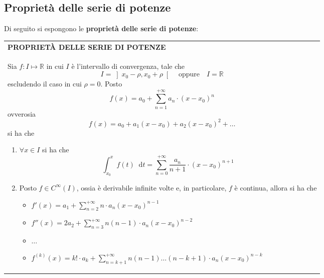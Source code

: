\documentclass[a4paper]{extarticle}
\renewcommand\arraystretch{}
\newcommand*\dif{\mathop{}\!\mathrm{d}}
\begin{document}
\subsection{Proprietà delle serie di potenze}
Di seguito si espongono le \textbf{proprietà delle serie di potenze}:

\vspace{1em}
\setlength{\tabcolsep}{14pt}
\renewcommand{\arraystretch}{2}
\noindent
\begin{tabularx}{\textwidth}{@{}|P|@{}}
    \hline
    {\textbf{PROPRIETÀ DELLE SERIE DI POTENZE}}\\
    \parbox{\linewidth}{Sia $f : I \longmapsto \mathbb{R}$ in cui $I$ è l'intervallo di convergenza, tale che
    \[I = \left]x_0-\rho,x_0+\rho\right[ \hspace{1em} \text{oppure} \hspace{1em} I = \mathbb{R}\] 
    escludendo il caso in cui $\rho=0$. Posto
    \[f(x) = a_0 + \sum_{n=1}^{+\infty} a_n \cdot (x-x_0)^n\]
    ovverosia
    \[f(x) = a_0 + a_1 (x-x_0) + a_2 (x-x_0)^2 + \dots\]
    si ha che
    \begin{enumerate}
        \item $\forall x \in I$ si ha che
        \[\int_{x_0}^x f(t) \dif t = \sum_{n=0}^{+\infty} \frac{a_n}{n+1} \cdot (x-x_0)^{n+1}\]
        
        \item Posto $f \in C^{\infty}(I)$, ossia è derivabile infinite volte e, in particolare, $f$ è continua, allora si ha che
        \begin{itemize}
            \item $\displaystyle{f'(x) = a_1 + \sum_{n=2}^{+\infty} n \cdot a_n (x-x_0)^{n-1}}$
            \item $\displaystyle{f''(x) = 2a_2 + \sum_{n=3}^{+\infty} n (n-1) \cdot a_n (x-x_0)^{n-2}}$
            \item $\dots$
            \item $\displaystyle{f^{(k)}(x) = k! \cdot a_k + \sum_{n=k+1}^{+\infty} n (n-1) \dots (n-k+1) \cdot a_n (x-x_0)^{n-k}}$
        \end{itemize}
    \end{enumerate}
    \vspace{1mm}}\\
    \hline
\end{tabularx}
\end{document}
